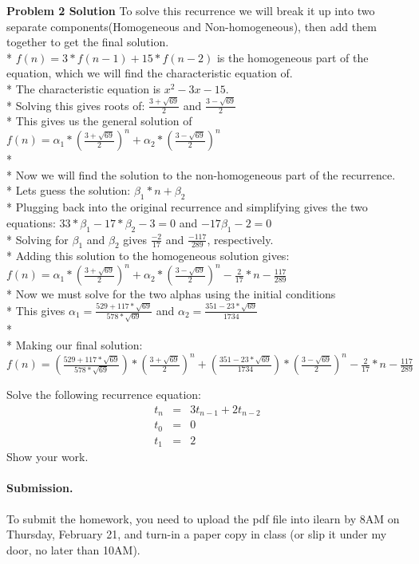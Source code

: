 \documentclass{article}
\begin{document}
\textbf{Problem 2 Solution}
To solve this recurrence we will break it up into two separate components(Homogeneous and Non-homogeneous), then add them together to get the final solution.
\\*
$f(n) = 3*f(n-1) + 15*f(n-2)$ is the homogeneous part of the equation, which we will find the characteristic equation of.
\\*
The characteristic equation is $x^2 - 3x - 15$.
\\*
Solving this gives roots of: $\frac{3+\sqrt{69}}{2}$ and $\frac{3-\sqrt{69}}{2}$
\\*
This gives us the general solution of $f(n) = \alpha_1*(\frac{3+\sqrt{69}}{2})^n + \alpha_2 * (\frac{3-\sqrt{69}}{2})^n$
\\*\\*
Now we will find the solution to the non-homogeneous part of the recurrence.
\\*
Lets guess the solution: $\beta_1 * n + \beta_2$
\\*
Plugging back into the original recurrence and simplifying gives the two equations: $33*\beta_1 - 17*\beta_2 - 3 = 0$ and $-17\beta_1 - 2 = 0$
\\*
Solving for $\beta_1$ and $\beta_2$ gives $\frac{-2}{17}$ and $\frac{-117}{289}$, respectively.
\\*
Adding this solution to the homogeneous solution gives: $f(n) = \alpha_1*(\frac{3+\sqrt{69}}{2})^n + \alpha_2 * (\frac{3-\sqrt{69}}{2})^n - \frac{2}{17} * n - \frac{117}{289}$
\\*
Now we must solve for the two alphas using the initial conditions
\\*
This gives $\alpha_1 = \frac{529+117*\sqrt{69}}{578*\sqrt{69}}$ and $\alpha_2 = \frac{351 - 23* \sqrt{69}}{1734}$
\\*\\*
Making our final solution: $f(n) = (\frac{529+117*\sqrt{69}}{578*\sqrt{69}}) *(\frac{3+\sqrt{69}}{2})^n + (\frac{351 - 23* \sqrt{69}}{1734}) * (\frac{3-\sqrt{69}}{2})^n - \frac{2}{17} * n - \frac{117}{289}$


\begin{problem}
Solve the following recurrence equation:
%
\begin{eqnarray*}
        t_n &=& 3t_{n-1} + 2t_{n-2}\\
        t_0 &=& 0 \\
        t_1 &=& 2
\end{eqnarray*}
%
Show your work.
\end{problem}

\vskip 0.1in
\paragraph{Submission.}
To submit the homework, you need to upload the pdf file into ilearn by 8AM on Thursday, February 21,
and turn-in a paper copy in class (or slip it under my door, no later than 10AM).
\end{document}
